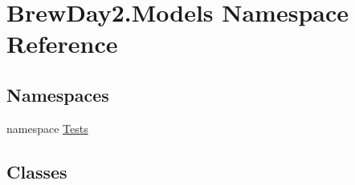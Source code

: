 \hypertarget{namespace_brew_day2_1_1_models}{}\section{Brew\+Day2.\+Models Namespace Reference}
\label{namespace_brew_day2_1_1_models}
\subsection*{Namespaces}
\begin{DoxyCompactItemize}
\item 
namespace \mbox{\hyperlink{namespace_brew_day2_1_1_models_1_1_tests}{Tests}}
\end{DoxyCompactItemize}
\subsection*{Classes}
